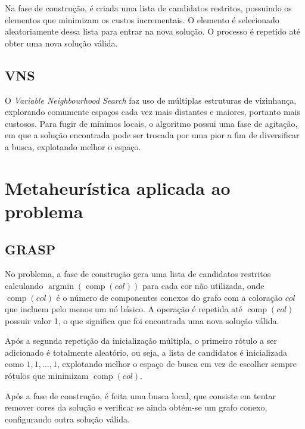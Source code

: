\documentclass[12pt, a4paper]{article}
\DeclareMathOperator{\argmin}{argmin}
\DeclareMathOperator{\comp}{comp}
\newcommand{\ic}[1]{\textbf{\lstinline{#1}}}
\begin{document}
Na fase de construção, é criada uma lista de candidatos restritos, possuindo os
elementos que minimizam os custos incrementais. O elemento é selecionado
aleatoriamente dessa lista para entrar na nova solução. O processo é repetido
até obter uma nova solução válida.

\subsection{VNS}
O \emph{Variable Neighbourhood Search} faz uso de múltiplas estruturas de
vizinhança, explorando comumente espaços cada vez mais distantes e maiores,
portanto mais custosos. Para fugir de mínimos locais, o algoritmo possui uma fase
de agitação, em que a solução encontrada pode ser trocada por uma pior a fim de
diversificar a busca, explotando melhor o espaço.

\section{Metaheurística aplicada ao problema}
\subsection{GRASP}
No problema, a fase de construção gera uma lista de candidatos restritos
calculando $ \argmin(\comp(col)) $ para cada cor não utilizada, onde $
\comp(col) $ é o número de componentes conexos do grafo com a coloração $ col $
que incluem pelo menos um nó básico. A operação é repetida até $ \comp(col) $
possuir valor 1, o que significa que foi encontrada uma nova solução válida.

Após a segunda repetição da inicialização múltipla, o primeiro rótulo a ser
adicionado é totalmente aleatório, ou seja, a lista de candidatos é
inicializada como $ {1, 1, ..., 1 } $, explotando melhor o espaço de busca em
vez de escolher sempre rótulos que minimizam $ \comp(col) $.

Após a fase de construção, é feita uma busca local, que consiste em tentar
remover cores da solução e verificar se ainda obtém-se um grafo conexo,
configurando outra solução válida.

\end{document}
